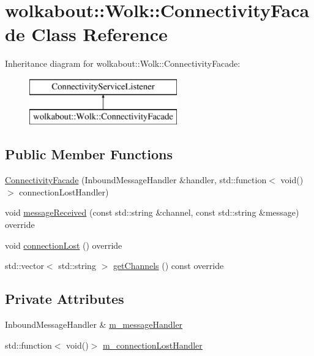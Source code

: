 \hypertarget{classwolkabout_1_1_wolk_1_1_connectivity_facade}{}\section{wolkabout\+:\+:Wolk\+:\+:Connectivity\+Facade Class Reference}
\label{classwolkabout_1_1_wolk_1_1_connectivity_facade}
Inheritance diagram for wolkabout\+:\+:Wolk\+:\+:Connectivity\+Facade\+:\begin{figure}[H]
\begin{center}
\leavevmode
\includegraphics[height=2.000000cm]{classwolkabout_1_1_wolk_1_1_connectivity_facade}
\end{center}
\end{figure}
\subsection*{Public Member Functions}
\begin{DoxyCompactItemize}
\item 
\hyperlink{classwolkabout_1_1_wolk_1_1_connectivity_facade_a85471a9d7bf22254a6c083dceba55450}{Connectivity\+Facade} (Inbound\+Message\+Handler \&handler, std\+::function$<$ void()$>$ connection\+Lost\+Handler)
\item 
void \hyperlink{classwolkabout_1_1_wolk_1_1_connectivity_facade_a40bd02a3c7c65618f9662a4a4234f157}{message\+Received} (const std\+::string \&channel, const std\+::string \&message) override
\item 
void \hyperlink{classwolkabout_1_1_wolk_1_1_connectivity_facade_a16233edc1133bbb6dd19c19985674328}{connection\+Lost} () override
\item 
std\+::vector$<$ std\+::string $>$ \hyperlink{classwolkabout_1_1_wolk_1_1_connectivity_facade_a5494e952f413e2bcf0856d7ccf7dae86}{get\+Channels} () const override
\end{DoxyCompactItemize}
\subsection*{Private Attributes}
\begin{DoxyCompactItemize}
\item 
Inbound\+Message\+Handler \& \hyperlink{classwolkabout_1_1_wolk_1_1_connectivity_facade_a3bb32b6dccd5d889b96d4dd957d5466e}{m\+\_\+message\+Handler}
\item 
std\+::function$<$ void()$>$ \hyperlink{classwolkabout_1_1_wolk_1_1_connectivity_facade_abcb09f790a27656ce879445d147dd090}{m\+\_\+connection\+Lost\+Handler}
\end{DoxyCompactItemize}


